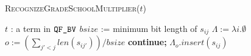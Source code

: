 \begin{algorithm}[t]
 \caption{\textsc{RecognizeGradeSchoolMultiplier}($t$)}
 \label{alg:grade}
 \begin{algorithmic}[1]
   \Ensure $t$ : a term in $\texttt{QF\_BV}$
   \State $bsize$ :=  minimum bit length of $s_{ij}$
   \State $\Lambda := \lambda i. \emptyset$
   \State $o := (\sum_{j' < j} len( s_{ij'}))/bsize$
    {\bf continue;}
    $\Lambda_o.insert( s_{ij})$
   \Else~
   \EndIf
   \EndFor
   \State {}
   \EndIf
   \State {}
 \end{algorithmic}
\end{algorithm}  




